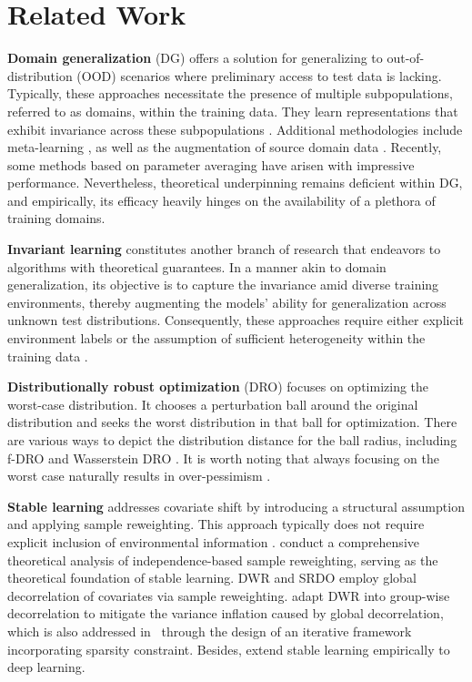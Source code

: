 \section{Related Work}

\textbf{Domain generalization} (DG) offers a solution for generalizing to out-of-distribution (OOD) scenarios where preliminary access to test data is lacking. Typically, these approaches necessitate the presence of multiple subpopulations, referred to as domains, within the training data. They learn representations that exhibit invariance across these subpopulations \citep{ghifary2015domain, li2018domain, shankar2018generalizing}. Additional methodologies include meta-learning \citep{li2018learning, balaji2018metareg, li2019episodic}, as well as the augmentation of source domain data \citep{qiao2020learning, zhou2020domain}. Recently, some methods based on parameter averaging have arisen \citep{cha2021swad, arpit2022ensemble} with impressive performance. 
Nevertheless, theoretical underpinning remains deficient within DG, and empirically, its efficacy heavily hinges on the availability of a plethora of training domains.


\textbf{Invariant learning} constitutes another branch of research that endeavors to algorithms with theoretical guarantees. In a manner akin to domain generalization, its objective is to capture the invariance amid diverse training environments, thereby augmenting the models' ability for generalization across unknown test distributions. Consequently, these approaches require either explicit environment labels \citep{arjovsky2019invariant, koyama2020out, krueger2021out} or the assumption of sufficient heterogeneity within the training data \citep{liu2021heterogeneous}. 

\textbf{Distributionally robust optimization} (DRO) focuses on optimizing the worst-case distribution. It chooses a perturbation ball around the original distribution and seeks the worst distribution in that ball for optimization. There are various ways to depict the distribution distance for the ball radius, including f-DRO \citep{duchi2021learning} and Wasserstein DRO \citep{sinha2018certifying}. It is worth noting that always focusing on the worst case naturally results in over-pessimism \citep{liu2022distributionally}. 



\textbf{Stable learning} addresses covariate shift by introducing a structural assumption and applying sample reweighting. This approach typically does not require explicit inclusion of environmental information \citep{cui2022stable}. \citet{xu2021stable} conduct a comprehensive theoretical analysis of independence-based sample reweighting, serving as the theoretical foundation of stable learning. 
DWR \citep{kuang2020stable} and SRDO \citep{shen2020stable} employ global decorrelation of covariates via sample reweighting. \citet{shen2020stable2} adapt DWR into group-wise decorrelation to mitigate the variance inflation caused by global decorrelation, which is also addressed in~\citet{yu2023stable} through the design of an iterative framework incorporating sparsity constraint. 
Besides, \citet{zhang2021deep} extend stable learning empirically to deep learning. 

